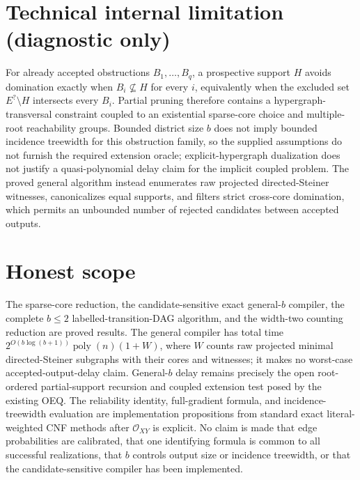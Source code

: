 \documentclass{article}
\begin{document}
\section*{Technical internal limitation (diagnostic only)}

For already accepted obstructions \(B_1,\ldots,B_q\), a prospective support \(H\) avoids domination exactly when \(B_i\nsubseteq H\) for every \(i\), equivalently when the excluded set \(E^{?}\setminus H\) intersects every \(B_i\).  Partial pruning therefore contains a hypergraph-transversal constraint coupled to an existential sparse-core choice and multiple-root reachability groups.  Bounded district size \(b\) does not imply bounded incidence treewidth for this obstruction family, so the supplied assumptions do not furnish the required extension oracle; explicit-hypergraph dualization does not justify a quasi-polynomial delay claim for the implicit coupled problem.  The proved general algorithm instead enumerates raw projected directed-Steiner witnesses, canonicalizes equal supports, and filters strict cross-core domination, which permits an unbounded number of rejected candidates between accepted outputs.

\section{Honest scope}

The sparse-core reduction, the candidate-sensitive exact general-\(b\) compiler, the complete \(b\le2\) labelled-transition-DAG algorithm, and the width-two counting reduction are proved results.  The general compiler has total time \(2^{O(b\log(b+1))}\operatorname{poly}(n)(1+W)\), where \(W\) counts raw projected minimal directed-Steiner subgraphs with their cores and witnesses; it makes no worst-case accepted-output-delay claim.  General-\(b\) delay remains precisely the open root-ordered partial-support recursion and coupled extension test posed by the existing OEQ.  The reliability identity, full-gradient formula, and incidence-treewidth evaluation are implementation propositions from standard exact literal-weighted CNF methods after \(\mathcal O_{XY}\) is explicit.  No claim is made that edge probabilities are calibrated, that one identifying formula is common to all successful realizations, that \(b\) controls output size or incidence treewidth, or that the candidate-sensitive compiler has been implemented.
\end{document}
